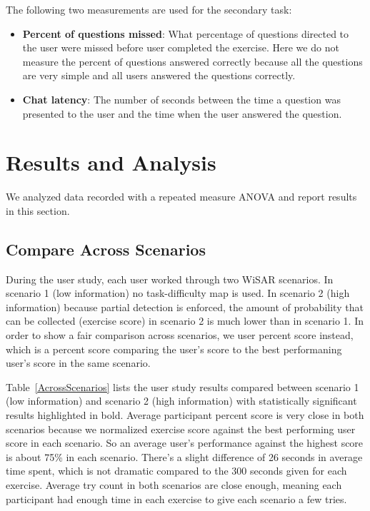 \documentclass[journal]{IEEEtran}
\begin{document}
The following two measurements are used for the secondary task:
\begin{itemize}
\item \textbf{Percent of questions missed}: What percentage of questions directed to the user were missed before user completed the exercise. Here we do not measure the percent of questions answered correctly because all the questions are very simple and all users answered the questions correctly.
\item \textbf{Chat latency}: The number of seconds between the time a question was presented to the user and the time when the user answered the question.
\end{itemize}

\section{Results and Analysis} 
\label{sec:Results}

We analyzed data recorded with a repeated measure ANOVA and report results in this section.

\subsection{Compare Across Scenarios}

During the user study, each user worked through two WiSAR scenarios. In scenario 1 (low information) no task-difficulty map is used. In scenario 2 (high information) because partial detection is enforced, the amount of probability that can be collected (exercise score) in scenario 2 is much lower than in scenario 1. In order to show a fair comparison across scenarios, we user percent score instead, which is a percent score comparing the user's score to the best performaning user's score in the same scenario.

Table~\ref{AcrossScenarios} lists the user study results compared between scenario 1 (low information) and scenario 2 (high information) with statistically significant results highlighted in bold. Average participant percent score is very close in both scenarios because we normalized exercise score against the best performing user score in each scenario. So an average user's performance against the highest score is about 75\% in each scenario. There's a slight difference of 26 seconds in average time spent, which is not dramatic compared to the 300 seconds given for each exercise. Average try count in both scenarios are close enough, meaning each participant had enough time in each exercise to give each scenario a few tries.
\end{document}
